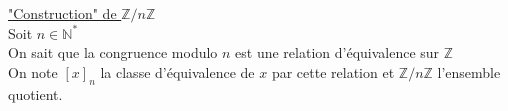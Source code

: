 \documentclass[10pt,a4paper]{article}
\theoremstyle{definition}
\begin{document}
\noindent \uline{"Construction" de $\mathbb{Z} / n\mathbb{Z}$} \\
Soit $n \in \mathbb{N}^*$ \\
On sait que la congruence modulo $n$ est une relation d'équivalence sur $\mathbb{Z}$ \\
On note $\left[ x \right]_n$ la classe d'équivalence de $x$ par cette relation et $\mathbb{Z} / n\mathbb{Z}$ l'ensemble quotient.
\end{document}
